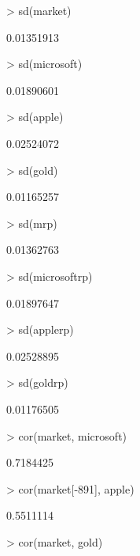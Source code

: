 \documentclass[12pt, a14paper, lithuanian]{article}
\begin{document}
\begin{Schunk}
\begin{Sinput}
> sd(market)
\end{Sinput}
\begin{Soutput}
[1] 0.01351913
\end{Soutput}
\begin{Sinput}
> sd(microsoft)
\end{Sinput}
\begin{Soutput}
[1] 0.01890601
\end{Soutput}
\begin{Sinput}
> sd(apple)
\end{Sinput}
\begin{Soutput}
[1] 0.02524072
\end{Soutput}
\begin{Sinput}
> sd(gold)
\end{Sinput}
\begin{Soutput}
[1] 0.01165257
\end{Soutput}
\begin{Sinput}
> sd(mrp)
\end{Sinput}
\begin{Soutput}
[1] 0.01362763
\end{Soutput}
\begin{Sinput}
> sd(microsoftrp)
\end{Sinput}
\begin{Soutput}
[1] 0.01897647
\end{Soutput}
\begin{Sinput}
> sd(applerp)
\end{Sinput}
\begin{Soutput}
[1] 0.02528895
\end{Soutput}
\begin{Sinput}
> sd(goldrp)
\end{Sinput}
\begin{Soutput}
[1] 0.01176505
\end{Soutput}
\begin{Sinput}
> cor(market, microsoft)
\end{Sinput}
\begin{Soutput}
[1] 0.7184425
\end{Soutput}
\begin{Sinput}
> cor(market[-891], apple)
\end{Sinput}
\begin{Soutput}
[1] 0.5511114
\end{Soutput}
\begin{Sinput}
> cor(market, gold)
\end{Sinput}
\begin{Soutput}

\end{Soutput}
\end{Schunk}
\end{document}
